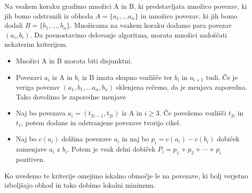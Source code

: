 \documentclass[a4paper,12pt]{article}
\begin{document}
Na vsakem koraku gradimo množici A in B, ki predstavljata množico povezav, ki jih bomo odstranili iz obhoda $A=\{a_1, \dots a_n\}$ in množico povezav, ki jih bomo dodali $B=\{b_1, \dots, b_n\}$. Množicama na vsakem koraku dodamo para povezav$(a_i, b_i)$. Da poenostavimo delovanje algoritma, morata množici zadoščati nekaterim kriterijem. 
\begin{itemize}

\item Množici A in B morata biti disjunktni.  
\item Povezavi $a_i$ iz A in $b_i$ iz B imata skupno vozlišče ter $b_i$ in  $a_{i+1}$ tudi. Če je veriga povezav $(a_1, b_1,\dots a_n, b_n)$ sklenjena rečemo, da je menjava zaporedna. Tako dovolimo le zaporedne menjave
\item Naj bo povezava $a_i = (t_{2i-1}, t_{2i})$  iz A in $i\ge 3$. Če povežemo vozlišči $t_{2i}$ in $t_1$, potem dodane in odstranjene povezave tvorijo cikel.
\item Naj bo $c(a_i)$ dolžina povezave $a_i$ in naj bo $p_i = c(a_i) - c(b_i)$ dobiček zamenjave $a_i$ z $b_i$. Potem je vsak delni dobiček $P_i = p_1 + p_2 + \cdots + p_i$ pozitiven.

\end{itemize}

Ko uvedemo te kriterije omejimo iskalno območje le na povezave, ki bolj verjetno izboljšajo obhod in tako dobimo lokalni minimum.
\end{document}
